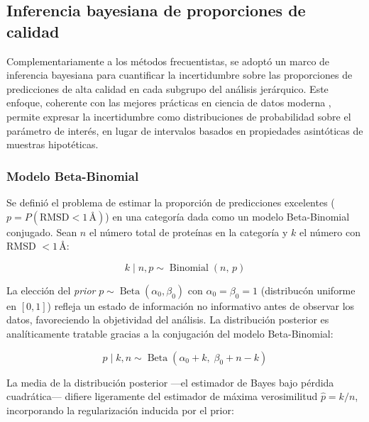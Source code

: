 \subsection{Inferencia bayesiana de proporciones de calidad}
\label{subsec:inferencia_bayesiana}

Complementariamente a los m\'etodos frecuentistas, se adopt\'o un marco de inferencia
bayesiana para cuantificar la incertidumbre sobre las proporciones de predicciones
de alta calidad en cada subgrupo del an\'alisis jer\'arquico. Este enfoque, coherente con
las mejores pr\'acticas en ciencia de datos moderna \citep{Gelman2013}, permite expresar
la incertidumbre como distribuciones de probabilidad sobre el par\'ametro de inter\'es,
en lugar de intervalos basados en propiedades asint\'oticas de muestras hipot\'eticas.

\subsubsection{Modelo Beta-Binomial}

Se defini\'o el problema de estimar la proporci\'on de predicciones excelentes
($p = P(\text{RMSD} < 1\,\text{\AA})$) en una categor\'ia dada como un modelo
Beta-Binomial conjugado. Sean $n$ el n\'umero total de prote\'inas en la categor\'ia y
$k$ el n\'umero con RMSD $< 1$\,\AA{}:

\begin{equation}
    k \mid n, p \sim \operatorname{Binomial}(n,\, p)
    \label{eq:likelihood}
\end{equation}

La elecci\'on del \emph{prior} $p \sim \operatorname{Beta}(\alpha_0, \beta_0)$ con
$\alpha_0 = \beta_0 = 1$ (distribuc\'on uniforme en $[0,1]$) refleja un estado de
informaci\'on no informativo antes de observar los datos, favoreciendo la objetividad
del an\'alisis. La distribuci\'on posterior es anal\'iticamente tratable gracias a la
conjugaci\'on del modelo Beta-Binomial:

\begin{equation}
    p \mid k, n \sim \operatorname{Beta}\!\left(\alpha_0 + k,\; \beta_0 + n - k\right)
    \label{eq:posterior}
\end{equation}

La media de la distribuci\'on posterior ---el estimador de Bayes bajo p\'erdida cuadr\'atica---
difiere ligeramente del estimador de m\'axima verosimilitud $\hat{p} = k/n$, incorporando
la regularizaci\'on inducida por el prior:

